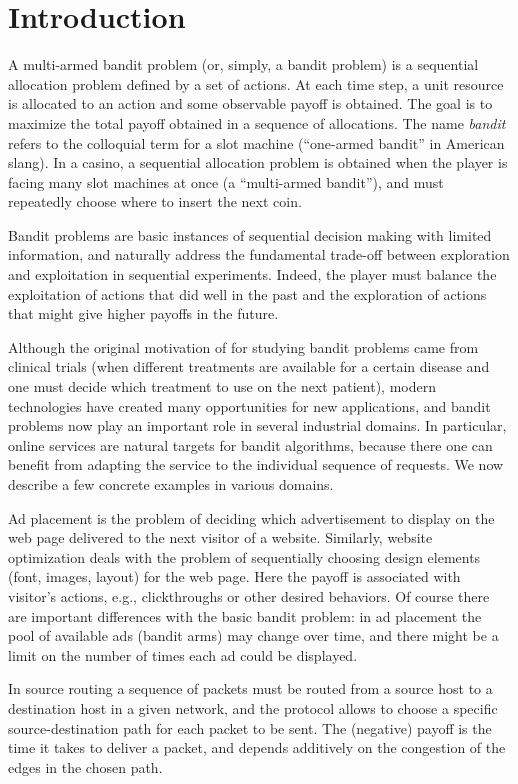 \documentclass[11pt]{hackednow}
\begin{document}
\chapter{Introduction}
\label{intro}
A multi-armed bandit problem (or, simply, a bandit problem) is a sequential allocation problem defined by a set of actions. At each time step, a unit resource is allocated to an action and some observable payoff is obtained. The goal is to maximize the total payoff obtained in a sequence of allocations. The name \textsl{bandit} refers to the colloquial term for a slot machine (``one-armed bandit'' in American slang). In a casino, a sequential allocation problem is obtained when the player is facing many slot machines at once (a ``multi-armed bandit''), and must repeatedly choose where to insert the next coin.

Bandit problems are basic instances of sequential decision making with limited information, and naturally address the fundamental trade-off between exploration and exploitation in sequential experiments. Indeed, the player must balance the exploitation of actions that did well in the past and the exploration of actions that might give higher payoffs in the future.

Although the original motivation of \cite{Tho33} for studying bandit problems came from clinical trials (when different treatments are available for a certain disease and one must decide which treatment to use on the next patient), modern technologies have created many opportunities for new applications, and bandit problems now play an important role in several industrial domains. In particular, online services are natural targets for bandit algorithms, because there one can benefit from adapting the service to the individual sequence of requests. We now describe a few concrete examples in various domains.

Ad placement is the problem of deciding which advertisement to display on the web page delivered to the next visitor of a website. Similarly, website optimization deals with the problem of sequentially choosing design elements (font, images, layout) for the web page. Here the payoff is associated with visitor's actions, e.g., clickthroughs or other desired behaviors. Of course there are important differences with the basic bandit problem: in ad placement the pool of available ads (bandit arms) may change over time, and there might be a limit on the number of times each ad could be displayed.

In source routing a sequence of packets must be routed from a source host to a destination host in a given network, and the protocol allows to choose a specific source-destination path for each packet to be sent. The (negative) payoff is the time it takes to deliver a packet, and depends additively on the congestion of the edges in the chosen path.
\end{document}
